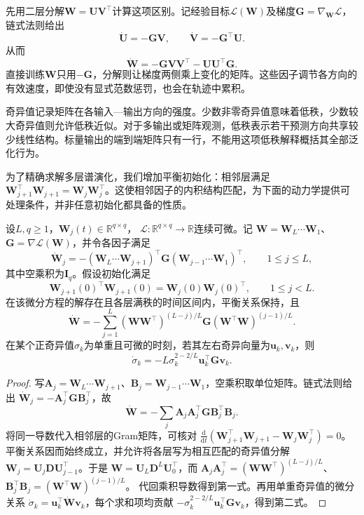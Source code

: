 先用二层分解$\bm W=\bm U\bm V^\top$计算这项区别。记经验目标$\mathcal L(\bm W)$及梯度$\bm G=\nabla_{\bm W}\mathcal L$，链式法则给出
\[
 \dot{\bm U}=-\bm G\bm V,\qquad
 \dot{\bm V}=-\bm G^\top\bm U.
\]
从而
\begin{equation}
 \dot{\bm W}=-\bm G\bm V\bm V^\top-\bm U\bm U^\top\bm G.
 \label{eq:factorized-gradient-flow}
\end{equation}
直接训练$\bm W$只用$-\bm G$，分解则让梯度两侧乘上变化的矩阵。这些因子调节各方向的有效速度，即使没有显式范数惩罚，也会在轨迹中累积。

奇异值记录矩阵在各输入—输出方向的强度。少数非零奇异值意味着低秩，少数较大奇异值则允许低秩近似。对于多输出或矩阵观测，低秩表示若干预测方向共享较少线性结构。标量输出的端到端矩阵只有一行，不能用这项低秩解释概括其全部泛化行为。

为了精确求解多层谱演化，我们增加平衡初始化：相邻层满足$\bm W_{j+1}^\top\bm W_{j+1}=\bm W_j\bm W_j^\top$。这使相邻因子的内积结构匹配，为下面的动力学提供可处理条件，并非任意初始化都具备的性质。

\begin{theorem}[平衡深层线性网络的梯度流]
\label{thm:balanced-deep-linear-flow}
设$L,q\geq1$，$\bm W_j(t)\in\mathbb R^{q\times q}$，
$\mathcal L:\mathbb R^{q\times q}\to\mathbb R$连续可微。记
$\bm W=\bm W_L\cdots\bm W_1$、$\bm G=\nabla\mathcal L(\bm W)$，并令各因子满足
\[
 \dot{\bm W}_j
 =-(\bm W_L\cdots\bm W_{j+1})^\top
   \bm G
   (\bm W_{j-1}\cdots\bm W_1)^\top,\qquad 1\leq j\leq L,
\]
其中空乘积为$\bm I_q$。假设初始化满足
\[
 \bm W_{j+1}(0)^\top\bm W_{j+1}(0)
 =\bm W_j(0)\bm W_j(0)^\top,\qquad 1\leq j<L.
\]
在该微分方程的解存在且各层满秩的时间区间内，平衡关系保持，且
\begin{equation}
 \dot{\bm W}
 =-\sum_{j=1}^{L}
   (\bm W\bm W^\top)^{(L-j)/L}\bm G
   (\bm W^\top\bm W)^{(j-1)/L}.
 \label{eq:balanced-matrix-gradient-flow}
\end{equation}
在某个正奇异值$\sigma_k$为单重且可微的时刻，若其左右奇异向量为$\bm u_k,\bm v_k$，则
\begin{equation}
 \dot\sigma_k=-L\sigma_k^{2-2/L}\bm u_k^\top\bm G\bm v_k.
 \label{eq:deep-singular-value-dynamics}
\end{equation}
\end{theorem}
\begin{proof}
写$\bm A_j=\bm W_L\cdots\bm W_{j+1}$、$\bm B_j=\bm W_{j-1}\cdots\bm W_1$，空乘积取单位矩阵。链式法则给出
$\dot{\bm W}_j=-\bm A_j^\top\bm G\bm B_j^\top$，故
\[
 \dot{\bm W}=-\sum_j\bm A_j\bm A_j^\top\bm G\bm B_j^\top\bm B_j.
\]
将同一导数代入相邻层的Gram矩阵，可核对
$\frac{\mathrm d}{\mathrm dt}(\bm W_{j+1}^\top\bm W_{j+1}-\bm W_j\bm W_j^\top)=0$。
平衡关系因而始终成立，并允许将各层写为相互匹配的奇异值分解
$\bm W_j=\bm U_j\bm D\bm U_{j-1}^\top$。于是
$\bm W=\bm U_L\bm D^L\bm U_0^\top$，而
$\bm A_j\bm A_j^\top=(\bm W\bm W^\top)^{(L-j)/L}$、
$\bm B_j^\top\bm B_j=(\bm W^\top\bm W)^{(j-1)/L}$。
代回乘积导数得到第一式。再用单重奇异值的微分关系
$\dot\sigma_k=\bm u_k^\top\dot{\bm W}\bm v_k$，每个求和项均贡献
$-\sigma_k^{2-2/L}\bm u_k^\top\bm G\bm v_k$，得到第二式。
\end{proof}

